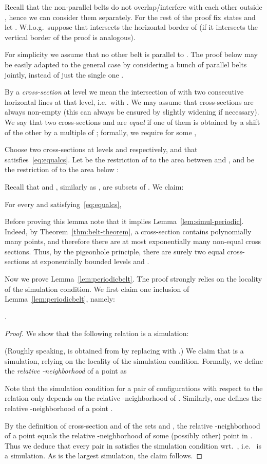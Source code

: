 Recall that the non-parallel belts do not overlap/interfere with each other outside , hence 
we can consider them separately. 
For the rest of the proof fix states  and let .
W.l.o.g.~suppose that  intersects the horizontal border of  
(if it intersects the vertical border of  the proof is analogous).

For simplicity we assume that no other belt is parallel to .
The proof below may be easily adapted to the general case by considering a bunch of parallel belts
jointly, instead of just the single one .

By a \emph{cross-section} at level  we mean the intersection of 
with two consecutive horizontal lines at that level,
i.e.~with .
We may assume that cross-sections are always non-empty (this can always be ensured by
slightly widening  if necessary).
We say that two cross-sections  and  are \emph{equal} if
one of them is obtained by a shift of the other by a multiple of ; formally, we require 
for some ,

Choose two cross-sections  at levels  and  respectively,
and  that satisfies~\eqref{eq:equalcs}.
Let  be the restriction of  to the area between  and , 
and  be the restriction of  to the area below :

Recall that  and , similarly as , are subsets of . We claim: 
\begin{lemma} \label{lem:periodicbelt}
For every  and  satisfying~\eqref{eq:equalcs},

\end{lemma}
Before proving this lemma note that it implies Lemma~\ref{lem:simul-periodic}.
Indeed, by Theorem~\ref{thm:belt-theorem}, a cross-section contains polynomially many points, and therefore there are at most exponentially many non-equal
cross sections.
Thus, by the pigeonhole principle, there are surely two equal cross-sections
at exponentially bounded levels  and .
 


Now we prove Lemma~\ref{lem:periodicbelt}. The proof strongly relies on the locality of the simulation condition.
We first claim one inclusion of Lemma~\ref{lem:periodicbelt}, namely:
\begin{claim} \label{cl:incl}
.
\end{claim}
\begin{proof}
We show  that the following relation is a simulation:

(Roughly speaking,  is obtained from  by replacing  with .)
We claim that  is a simulation, relying on the locality of the simulation condition.
Formally, we define the \emph{relative -neighborhood} of a point  as 
 
Note that the simulation condition for a pair of configurations  with respect to the relation  
only depends on the relative -neighborhood of . 
Similarly, one defines the relative -neighborhood of a point .

By the definition of cross-section and of the sets  and , 
the relative -neighborhood of a point  equals the relative -neighborhood of some 
(possibly other) point in .
Thus we deduce that every pair in  satisfies the simulation condition wrt.~, i.e.~ is a simulation.
As  is the largest simulation, the claim follows.
\end{proof}

